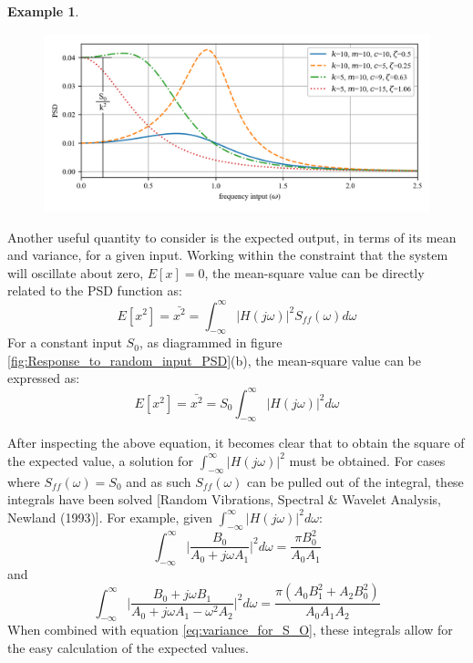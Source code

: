 \documentclass[12pt,letter]{article}
\newtheorem{ex}{Example}
\numberwithin{ex}{section} %
\newenvironment{example}{\begin{mdframed}[middlelinewidth=0.5mm]\begin{ex}\normalfont}{\end{ex}\end{mdframed}}
\numberwithin{re}{section} %
\begin{document}
\begin{example}
\begin{figure}[H]
		\centering
		\includegraphics[width=1\textwidth]{../figures/response_to_white_noise_with_annotation.png}
	\end{figure}
\end{example}  

Another useful quantity to consider is the expected output, in terms of its mean and variance, for a given input. Working within the constraint that the system will oscillate about zero, $E[x]=0$, the mean-square value can be directly related to the PSD function as:
\begin{equation}
E[x^2] = \bar{x^2} =   \int_{-\infty}^{\infty} |H(j\omega)|^2 S_{ff}(\omega) d\omega
\end{equation}
For a constant input $S_0$, as diagrammed in figure \ref{fig:Response_to_random_input_PSD}(b), the mean-square value can be expressed as:
\begin{equation}
E[x^2] = \bar{x^2} =   S_{0} \int_{-\infty}^{\infty} |H(j\omega)|^2 d\omega
\label{eq:variance_for_S_O}
\end{equation}

After inspecting the above equation, it becomes clear that to obtain the square of the expected value, a solution for  $\int_{-\infty}^{\infty} |H(j\omega)|^2$ must be obtained. For cases where $S_{ff}(\omega) = S_0$ and as such $S_{ff}(\omega)$ can be pulled out of the integral, these integrals have been solved [Random Vibrations, Spectral \& Wavelet Analysis, Newland (1993)]. For example, given $\int_{-\infty}^{\infty} |H(j\omega)|^2 d\omega$:
\begin{equation}
\int_{-\infty}^{\infty} \bigg|\frac{B_0}{A_0+j \omega A_1} \bigg|^2 d\omega = \frac{\pi B_0^2}{A_0 A_1}
\end{equation} 
and
\begin{equation}
\int_{-\infty}^{\infty} \bigg|\frac{B_0 + j \omega B_1}{A_0+j \omega A_1 - \omega^2 A_2} \bigg|^2 d\omega = \frac{\pi (A_0 B_1^2 + A_2 B_0^2)}{A_0 A_1 A_2}
\end{equation} 
When combined with equation \ref{eq:variance_for_S_O}, these integrals allow for the easy calculation of the expected values. 
\end{document}
